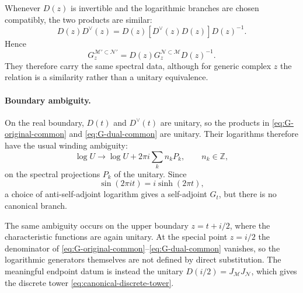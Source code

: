 \documentclass[a4paper,11pt]{article}
\theoremstyle{definition}
\newcommand{\mN}{\mathcal{N}}
\newcommand{\mM}{\mathcal{M}}
\begin{document}
Whenever $D(z)$ is invertible and the logarithmic branches are chosen
compatibly, the two products are similar:
\begin{equation}
    D(z)D^\vee(z)
    =
    D(z)
    \left[D^\vee(z)D(z)\right]
    D(z)^{-1}.
\end{equation}
Hence
\begin{equation}
    G_z^{\mM'\subset\mN'}
    =
    D(z)
    G_z^{\mN\subset\mM}
    D(z)^{-1}.
    \label{eq:G-similarity-common}
\end{equation}
They therefore carry the same spectral data, although for generic complex
$z$ the relation is a similarity rather than a unitary equivalence.

\paragraph{Boundary ambiguity.}
On the real boundary, $D(t)$ and $D^\vee(t)$ are unitary, so the products in
\eqref{eq:G-original-common} and \eqref{eq:G-dual-common} are unitary.
Their logarithms therefore have the usual winding ambiguity:
\begin{equation}
    \log U
    \longrightarrow
    \log U+2\pi i
    \sum_k n_kP_k,
    \qquad
    n_k\in\mathbb Z,
\end{equation}
on the spectral projections $P_k$ of the unitary. Since
\begin{equation}
    \sin(2\pi it)
    =
    i\sinh(2\pi t),
\end{equation}
a choice of anti-self-adjoint logarithm gives a self-adjoint $G_t$, but
there is no canonical branch.

The same ambiguity occurs on the upper boundary
$z=t+i/2$, where the characteristic functions are again unitary. At the
special point $z=i/2$ the denominator of
\eqref{eq:G-original-common}--\eqref{eq:G-dual-common} vanishes, so the
logarithmic generators themselves are not defined by direct substitution.
The meaningful endpoint datum is instead the unitary
$D(i/2)=J_{\mM}J_{\mN}$, which gives the discrete tower
\eqref{eq:canonical-discrete-tower}.
\end{document}
